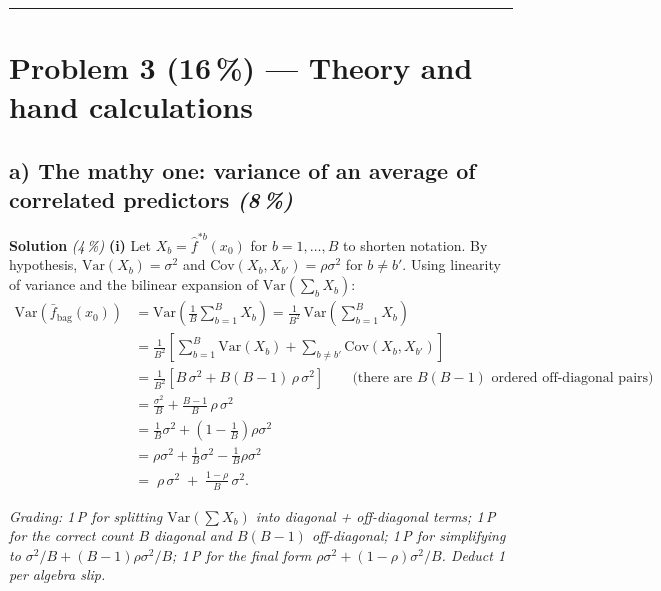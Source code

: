 \documentclass[11pt,a4paper]{article}
\newcommand{\points}[1]{\textbf{(#1\,\%)}}
\newcommand{\subpoints}[1]{\textit{(#1\,\%)}}
\newcommand{\sol}{\noindent\textbf{Solution}}
\begin{document}
\vspace{0.6em}
\hrule
\vspace{1em}

\section*{Problem 3 \points{16} --- Theory and hand calculations}

\subsection*{a) The mathy one: variance of an average of correlated predictors \subpoints{8}}

\sol{} \subpoints{4} \textbf{(i)} Let $X_b = \hat f^{*b}(x_0)$ for $b=1,\dots,B$ to shorten notation. By
hypothesis, $\mathrm{Var}(X_b)=\sigma^2$ and $\mathrm{Cov}(X_b,X_{b'})=\rho\sigma^2$ for $b\neq b'$.
Using linearity of variance and the bilinear expansion of $\mathrm{Var}(\sum_b X_b)$:
\begin{align*}
\mathrm{Var}\!\left(\bar f_{\text{bag}}(x_0)\right)
   &= \mathrm{Var}\!\left(\frac{1}{B}\sum_{b=1}^B X_b\right)
   = \frac{1}{B^2}\,\mathrm{Var}\!\left(\sum_{b=1}^B X_b\right) \\[2pt]
   &= \frac{1}{B^2}\!\left[\sum_{b=1}^B\mathrm{Var}(X_b) + \sum_{b\neq b'}\mathrm{Cov}(X_b,X_{b'})\right] \\[2pt]
   &= \frac{1}{B^2}\!\left[B\,\sigma^2 + B(B-1)\,\rho\,\sigma^2\right]
      \qquad\text{(there are $B(B-1)$ ordered off-diagonal pairs)} \\[2pt]
   &= \frac{\sigma^2}{B} + \frac{B-1}{B}\,\rho\,\sigma^2 \\[2pt]
   &= \frac{1}{B}\sigma^2 + \left(1 - \frac{1}{B}\right)\rho\sigma^2 \\[2pt]
   &= \rho\sigma^2 + \frac{1}{B}\sigma^2 - \frac{1}{B}\rho\sigma^2 \\[2pt]
   &= \boxed{\;\rho\,\sigma^2 \;+\; \frac{1-\rho}{B}\,\sigma^2.\;}
\end{align*}

\noindent\emph{Grading: 1\,P for splitting $\mathrm{Var}(\sum X_b)$ into diagonal + off-diagonal terms;
1\,P for the correct count $B$ diagonal and $B(B-1)$ off-diagonal; 1\,P for simplifying to
$\sigma^2/B + (B-1)\rho\sigma^2/B$; 1\,P for the final form $\rho\sigma^2+(1-\rho)\sigma^2/B$. Deduct
1 per algebra slip.}
\end{document}
